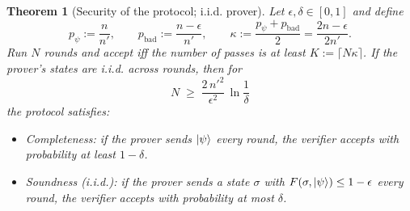 \documentclass[11pt]{article}
\newtheorem{theorem}{Theorem}
\begin{document}
\begin{theorem}[Security of the protocol; i.i.d. prover]
    \label{theorem: security iid}
    Let $\epsilon,\delta\in[0,1]$ and define
    \[
    p_\psi:=\frac{n}{n'},\qquad p_{\mathrm{bad}}:=\frac{n-\epsilon}{n'},\qquad 
    \kappa:=\frac{p_\psi+p_{\mathrm{bad}}}{2}=\frac{2n-\epsilon}{2n'}.
    \]
    Run $N$ rounds and \emph{accept iff} the number of passes is at least $K:=\lceil N\kappa\rceil$.
    If the prover’s states are i.i.d. across rounds, then for
    \[
    N \;\ge\; \frac{2\,n'^2}{\epsilon^2}\,\ln\frac{1}{\delta}
    \]
    the protocol satisfies:
    \begin{itemize}
    \item \emph{Completeness:} if the prover sends $\ket\psi$ every round, the verifier accepts with probability at least $1-\delta$.
    \item \emph{Soundness (i.i.d.):} if the prover sends a state $\sigma$ with $F(\sigma,\ket\psi)\le 1-\epsilon$ every round, the verifier accepts with probability at most $\delta$.
    \end{itemize}
    \end{theorem}
    
\end{document}
